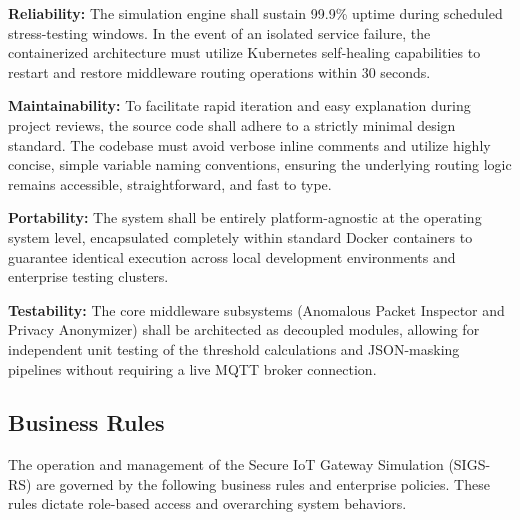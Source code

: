 \documentclass[12pt,letterpaper]{article}
\begin{document}
\vspace{0.08in}
\noindent\hspace*{0.94in} \textbf{Reliability:} The simulation engine shall sustain 99.9\% uptime during scheduled stress-testing windows. In the event of an isolated service failure, the containerized architecture must utilize Kubernetes self-healing capabilities to restart and restore middleware routing operations within 30 seconds.\par
\vspace{0.04in}
\noindent\hspace*{0.94in} \textbf{Maintainability:} To facilitate rapid iteration and easy explanation during project reviews, the source code shall adhere to a strictly minimal design standard. The codebase must avoid verbose inline comments and utilize highly concise, simple variable naming conventions, ensuring the underlying routing logic remains accessible, straightforward, and fast to type.\par
\vspace{0.04in}
\noindent\hspace*{0.94in} \textbf{Portability:} The system shall be entirely platform-agnostic at the operating system level, encapsulated completely within standard Docker containers to guarantee identical execution across local development environments and enterprise testing clusters.\par
\vspace{0.04in}
\noindent\hspace*{0.94in} \textbf{Testability:} The core middleware subsystems (Anomalous Packet Inspector and Privacy Anonymizer) shall be architected as decoupled modules, allowing for independent unit testing of the threshold calculations and JSON-masking pipelines without requiring a live MQTT broker connection.\par
\subsection{Business Rules}
The operation and management of the Secure IoT Gateway Simulation (SIGS-RS) are governed by the following business rules and enterprise policies. These rules dictate role-based access and overarching system behaviors.
\end{document}

